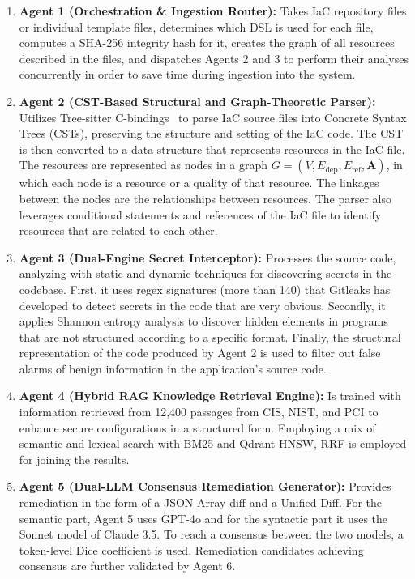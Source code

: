 \documentclass[runningheads]{llncs}
\begin{document}
\begin{enumerate}
    \item \textbf{Agent 1 (Orchestration \& Ingestion Router):} Takes IaC repository files or individual template files, determines which DSL is used for each file, computes a SHA-256 integrity hash for it, creates the graph of all resources described in the files, and dispatches Agents 2 and 3 to perform their analyses concurrently in order to save time during ingestion into the system.
    \item \textbf{Agent 2 (CST-Based Structural and Graph-Theoretic Parser):} Utilizes Tree-sitter C-bindings~\cite{treesitter2024} to parse IaC source files into Concrete Syntax Trees (CSTs), preserving the structure and setting of the IaC code. The CST is then converted to a data structure that represents resources in the IaC file. The resources are represented as nodes in a graph $G = (V, E_{\mathrm{dep}}, E_{\mathrm{ref}}, \mathbf{A})$, in which each node is a resource or a quality of that resource. The linkages between the nodes are the relationships between resources. The parser also leverages conditional statements and references of the IaC file to identify resources that are related to each other.
    \item \textbf{Agent 3 (Dual-Engine Secret Interceptor):} Processes the source code, analyzing with static and dynamic techniques for discovering secrets in the codebase. First, it uses regex signatures (more than 140) that Gitleaks has developed to detect secrets in the code that are very obvious. Secondly, it applies Shannon entropy analysis to discover hidden elements in programs that are not structured according to a specific format. Finally, the structural representation of the code produced by Agent 2 is used to filter out false alarms of benign information in the application's source code.
    \item \textbf{Agent 4 (Hybrid RAG Knowledge Retrieval Engine):} Is trained with information retrieved from 12,400 passages from CIS, NIST, and PCI to enhance secure configurations in a structured form. Employing a mix of semantic and lexical search with BM25 and Qdrant HNSW, RRF is employed for joining the results.
    \item \textbf{Agent 5 (Dual-LLM Consensus Remediation Generator):} Provides remediation in the form of a JSON Array diff and a Unified Diff. For the semantic part, Agent 5 uses GPT-4o and for the syntactic part it uses the Sonnet model of Claude 3.5. To reach a consensus between the two models, a token-level Dice coefficient is used. Remediation candidates achieving consensus are further validated by Agent 6.

\end{enumerate}
\end{document}
